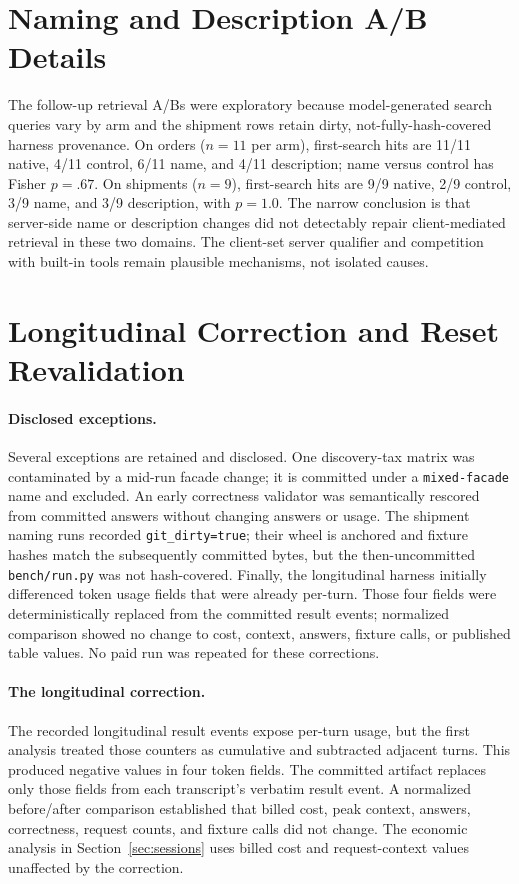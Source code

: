\documentclass[10pt,twocolumn]{article}
\begin{document}
\section{Naming and Description A/B Details}
\label{app:naming-ab}

The follow-up retrieval A/Bs were exploratory because model-generated search
queries vary by arm and the shipment rows retain dirty, not-fully-hash-covered
harness provenance.  On orders ($n=11$ per arm), first-search hits are 11/11
native, 4/11 control, 6/11 name, and 4/11 description; name versus control has
Fisher $p=.67$.  On shipments ($n=9$), first-search hits are 9/9 native, 2/9
control, 3/9 name, and 3/9 description, with $p=1.0$.  The narrow conclusion is
that server-side name or description changes did not detectably repair
client-mediated retrieval in these two domains.  The client-set server
qualifier and competition with built-in tools remain plausible mechanisms, not
isolated causes.

\section{Longitudinal Correction and Reset Revalidation}
\label{app:reset}

\paragraph{Disclosed exceptions.}  Several exceptions are retained and disclosed.  One discovery-tax matrix was
contaminated by a mid-run facade change; it is committed under a
\texttt{mixed-facade} name and excluded.  An early correctness validator was
semantically rescored from committed answers without changing answers or
usage.  The shipment naming runs recorded \texttt{git\_dirty=true}; their wheel
is anchored and fixture hashes match the subsequently committed bytes, but
the then-uncommitted \texttt{bench/run.py} was not hash-covered.  Finally, the
longitudinal harness initially differenced token usage fields that were
already per-turn.  Those four fields were deterministically replaced from the
committed result events; normalized comparison showed no change to cost,
context, answers, fixture calls, or published table values.  No paid run was
repeated for these corrections.

\paragraph{The longitudinal correction.}
The recorded longitudinal result events expose per-turn usage, but the first
analysis treated those counters as cumulative and subtracted adjacent turns.
This produced negative values in four token fields.  The committed artifact
replaces only those fields from each transcript's verbatim result event.  A
normalized before/after comparison established that billed cost, peak context,
answers, correctness, request counts, and fixture calls did not change.  The
economic analysis in Section~\ref{sec:sessions} uses billed cost and
request-context values unaffected by the correction.
\end{document}
